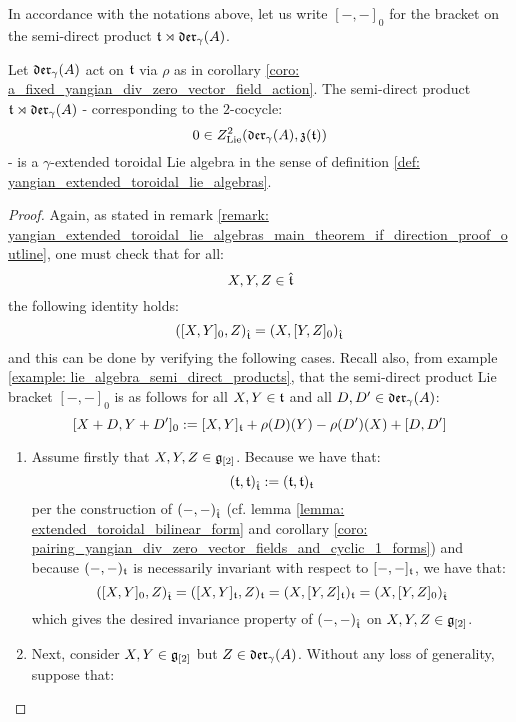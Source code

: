         In accordance with the notations above, let us write $[-, -]_0$ for the bracket on the semi-direct product $\mathfrak{t} \rtimes \mathfrak{der}_{\gamma}(A)$.
        \begin{lemma} \label{lemma: semi_direct_product_of_toroidal_lie_algebras_with_div_zero_vector_fields_are_yangian_extended_toroidal_lie_algebras}
            Let $\mathfrak{der}_{\gamma}(A)$ act on $\mathfrak{t}$ via $\rho$ as in corollary \ref{coro: a_fixed_yangian_div_zero_vector_field_action}. The semi-direct product $\mathfrak{t} \rtimes \mathfrak{der}_{\gamma}(A)$ - corresponding to the $2$-cocycle:
                $$0 \in Z^2_{\mathrm{Lie}}(\mathfrak{der}_{\gamma}(A), \mathfrak{z}(\mathfrak{t}))$$
            - is a $\gamma$-extended toroidal Lie algebra in the sense of definition \ref{def: yangian_extended_toroidal_lie_algebras}.
        \end{lemma}
            \begin{proof}
                Again, as stated in remark \ref{remark: yangian_extended_toroidal_lie_algebras_main_theorem_if_direction_proof_outline}, one must check that for all:
                    $$X, Y, Z \in \hat{\mathfrak{t}}$$
                the following identity holds:
                    $$( [X, Y]_0, Z )_{\hat{\mathfrak{t}}} = ( X, [Y, Z]_0 )_{\hat{\mathfrak{t}}}$$
                and this can be done by verifying the following cases. Recall also, from example \ref{example: lie_algebra_semi_direct_products}, that the semi-direct product Lie bracket $[-, -]_0$ is as follows for all $X, Y \in \mathfrak{t}$ and all $D, D' \in \mathfrak{der}_{\gamma}(A)$:
                    $$[X + D, Y + D']_0 := [X, Y]_{\mathfrak{t}} + \rho(D)(Y) - \rho(D')(X) + [D, D']$$
                \begin{enumerate}
                    \item Assume firstly that $X, Y, Z \in \mathfrak{g}_{[2]}$. Because we have that:
                        $$(\mathfrak{t}, \mathfrak{t})_{\hat{\mathfrak{t}}} := (\mathfrak{t}, \mathfrak{t})_{\mathfrak{t}}$$
                    per the construction of $(-, -)_{\hat{\mathfrak{t}}}$ (cf. lemma \ref{lemma: extended_toroidal_bilinear_form} and corollary \ref{coro: pairing_yangian_div_zero_vector_fields_and_cyclic_1_forms}) and because $(-, -)_{\mathfrak{t}}$ is necessarily invariant with respect to $[-, -]_{\mathfrak{t}}$, we have that:
                        $$( [X, Y]_0, Z )_{\hat{\mathfrak{t}}} = ( [X, Y]_{\mathfrak{t}}, Z )_{\mathfrak{t}} = ( X, [Y, Z]_{\mathfrak{t}} )_{\mathfrak{t}} = ( X, [Y, Z]_0 )_{\hat{\mathfrak{t}}}$$
                    which gives the desired invariance property of $(-, -)_{\hat{\mathfrak{t}}}$ on $X, Y, Z \in \mathfrak{g}_{[2]}$.
                    \item Next, consider $X, Y \in \mathfrak{g}_{[2]}$ but $Z \in \mathfrak{der}_{\gamma}(A)$. Without any loss of generality, suppose that:

\end{enumerate}
\end{proof}
